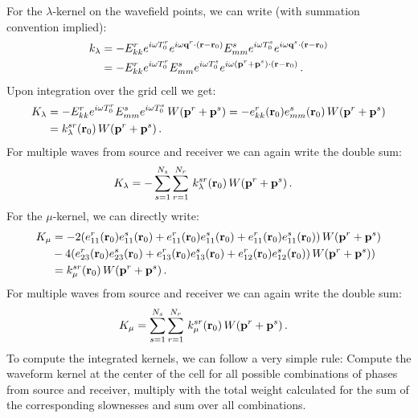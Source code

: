 %
For the $\lambda$-kernel on the wavefield points, we can write (with summation convention implied):
\begin{align}
   k_{\lambda} &= -E^r_{kk} e^{i\omega T^r_0}e^{i\omega\textbf q^r\cdot (\textbf r-\textbf r_0)}
                   E^s_{mm}e^{i\omega T^s_0}e^{i\omega\textbf q^s\cdot (\textbf r-\textbf r_0)} \notag \\
               &= -E^r_{kk} e^{i\omega T^r_0}E^s_{mm} e^{i\omega T^s_0}e^{i\omega(\textbf p^r+\textbf p^s)\cdot (\textbf r-\textbf r_0)} \,.
\end{align}
Upon integration over the grid cell we get:
\begin{align}
   K_{\lambda} &= -E^r_{kk} e^{i\omega T^r_0}E^s_{mm}e^{i\omega T^s_0}\,W(\textbf p^r+\textbf p^s)
                = -e^r_{kk}(\textbf r_0)e^s_{mm}(\textbf r_0)\,W(\textbf p^r+\textbf p^s) \notag \\
               &= k^{sr}_{\lambda}(\textbf r_0)\,W(\textbf p^r+\textbf p^s) \,.
\end{align}
For multiple waves from source and receiver we can again write the double sum:
\begin{align}
   K_{\lambda} &= -\sum_{s=1}^{N_s}\sum_{r=1}^{N_r}\,k^{sr}_{\lambda}(\textbf r_0)\,W(\textbf p^r+\textbf p^s) \,.
\end{align}
For the $\mu$-kernel, we can directly write:
\begin{align}
   K_{\mu} &= -2(e^r_{11}(\textbf r_0)e^s_{11}(\textbf r_0)+e^r_{11}(\textbf r_0)e^s_{11}(\textbf r_0)+e^r_{11}(\textbf r_0)e^s_{11}(\textbf r_0))\,W(\textbf p^r+\textbf p^s) \notag \\
           &  -4(e^r_{23}(\textbf r_0)e^s_{23}(\textbf r_0)+e^r_{13}(\textbf r_0)e^s_{13}(\textbf r_0)+e^r_{12}(\textbf r_0)e^s_{12}(\textbf r_0))\,W(\textbf p^r+\textbf p^s)) \notag \\
           &= k^{sr}_{\mu}(\textbf r_0)\,W(\textbf p^r+\textbf p^s) \,.
\end{align}
For multiple waves from source and receiver we can again write the double sum:
\begin{align}
   K_{\mu} &= \sum_{s=1}^{N_s}\sum_{r=1}^{N_r}\,k^{sr}_{\mu}(\textbf r_0)\,W(\textbf p^r+\textbf p^s) \,.
\end{align}
To compute the integrated kernels, we can follow a very simple rule: Compute the waveform kernel at the center of the cell for all possible combinations of phases from source and receiver, multiply with the total weight calculated for the sum of the corresponding slownesses and sum over all combinations.